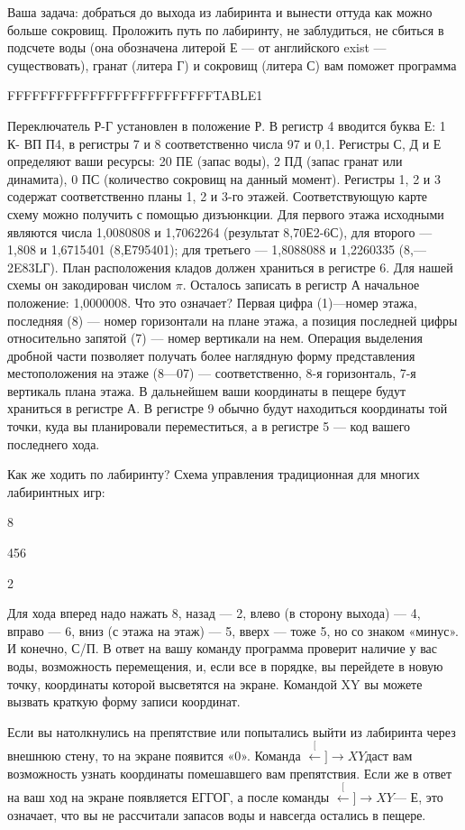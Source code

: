 \documentclass[11pt,a4paper,oneside]{article}
\def\XY{$\stackrel[\leftarrow]{\rightarrow}{XY}$}
\begin{document}
Ваша задача: добраться до выхода из лабиринта и вынести оттуда как можно больше сокровищ. Проложить путь по лабиринту, не заблудиться, не сбиться в подсчете воды (она обозначена литерой Е — от английского exist — существовать), гранат (литера Г) и сокровищ (литера С) вам поможет программа

FFFFFFFFFFFFFFFFFFFFFFFFFTABLE1

Переключатель Р-Г установлен в положение Р. В регистр 4 вводится буква Е: 1 К- ВП П4, в регистры 7 и 8 соответственно числа 97 и 0,1. Регистры С, Д и Е определяют ваши ресурсы: 20 ПЕ (запас воды), 2 ПД (запас гранат или динамита), 0 ПС (количество сокровищ на данный момент). Регистры 1, 2 и 3 содержат соответственно планы 1, 2 и 3-го этажей. Соответствующую карте схему можно получить с помощью дизъюнкции. Для первого этажа исходными являются числа 1,0080808 и 1,7062264 (результат 8,70Е2-6С), для второго — 1,808 и 1,6715401
(8,Е795401); для третьего — 1,8088088 и 1,2260335 (8,—2E83LГ). План расположения кладов должен храниться в регистре 6. Для нашей схемы он закодирован числом $\pi$. Осталось записать в регистр А начальное положение: 1,0000008. Что это означает? Первая цифра (1)—номер этажа, последняя (8) — номер горизонтали на плане этажа, а позиция последней цифры относительно запятой (7) — номер вертикали на нем. Операция выделения дробной части позволяет получать более наглядную форму представления местоположения на этаже (8—07) — соответственно, 8-я горизонталь, 7-я вертикаль плана этажа. В дальнейшем ваши координаты в пещере будут храниться в регистре А. В регистре 9 обычно будут находиться координаты той точки, куда вы планировали переместиться, а в регистре 5 — код вашего последнего хода.

Как же ходить по лабиринту? Схема управления традиционная для многих лабиринтных игр:

8

456

2

Для хода вперед надо нажать 8, назад — 2, влево (в сторону выхода) — 4, вправо — 6, вниз (с этажа на этаж) — 5, вверх — тоже 5, но со знаком «минус». И конечно, С/П. В ответ на вашу команду программа проверит наличие у вас воды, возможность перемещения, и, если все в порядке, вы перейдете в новую точку, координаты которой высветятся на экране. Командой XY вы можете вызвать краткую форму записи координат.

Если вы натолкнулись на препятствие или попытались выйти из лабиринта через внешнюю стену, то на экране появится «0». Команда \XY даст вам возможность узнать координаты помешавшего вам препятствия. Если же в ответ на ваш ход на экране появляется ЕГГОГ, а после команды \XY — Е, это означает, что вы не рассчитали запасов воды и навсегда остались в пещере.
\end{document}
